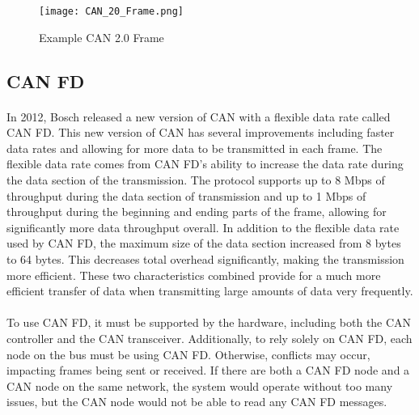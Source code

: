 \begin{figure}[H]
	\centering
	\texttt{[image: CAN\_20\_Frame.png]}
	\caption{Example CAN 2.0 Frame \cite{wikipediaCAN}}
	\label{fig:CANDataFrame}
\end{figure}

\subsection{CAN FD}

\paragraph{}
In 2012, Bosch released a new version of CAN with a flexible data rate called CAN FD\cite{BOSCH_CANFD}.
This new version of CAN has several improvements including faster data rates and allowing for more data to be transmitted in each frame.
The flexible data rate comes from CAN FD's ability to increase the data rate during the data section of the transmission.
The protocol supports up to 8 Mbps of throughput during the data section of transmission and up to 1 Mbps of throughput during the beginning and ending parts of the frame, allowing for significantly more data throughput overall.
In addition to the flexible data rate used by CAN FD, the maximum size of the data section increased from 8 bytes to 64 bytes.
This decreases total overhead significantly, making the transmission more efficient.
These two characteristics combined provide for a much more efficient transfer of data when transmitting large amounts of data very frequently.

\paragraph{}
To use CAN FD, it must be supported by the hardware, including both the CAN controller and the CAN transceiver.
Additionally, to rely solely on CAN FD, each node on the bus must be using CAN FD.
Otherwise, conflicts may occur, impacting frames being sent or received.
If there are both a CAN FD node and a CAN node on the same network, the system would operate without too many issues, but the CAN node would not be able to read any CAN FD messages.